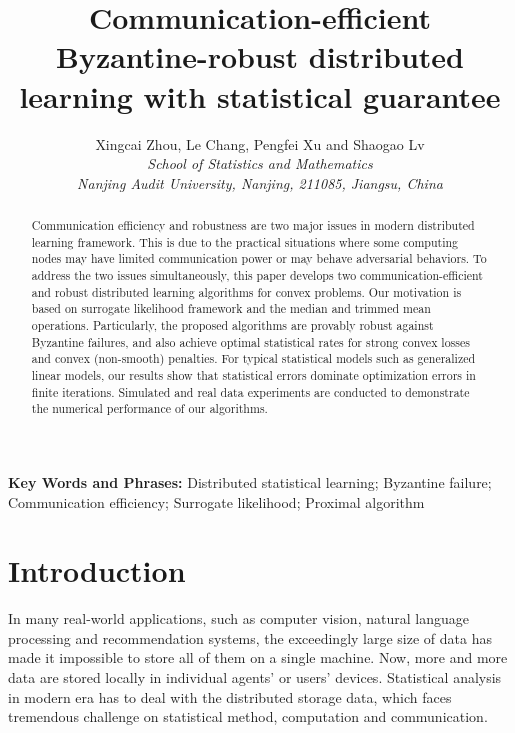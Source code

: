 \documentclass[12pt,a4paper]{article}%
\title{{Communication-efficient Byzantine-robust distributed learning with statistical guarantee}}
\author{Xingcai Zhou, Le Chang, Pengfei Xu and Shaogao Lv\\
{\sl School of Statistics and Mathematics}\\
{\sl Nanjing Audit University, Nanjing, 211085, Jiangsu, China}}
\date{}
\numberwithin{equation}{section}
\begin{document}
\maketitle
\setcounter{page}{1}

\begin{abstract}
Communication efficiency and robustness are two major issues in modern distributed learning framework. This is due to the practical situations where some computing nodes may have limited communication power or may behave adversarial behaviors. To address the two issues simultaneously,
this paper develops two communication-efficient and robust distributed learning algorithms for convex problems. Our motivation is based on surrogate likelihood framework and the median and trimmed mean operations. Particularly, the proposed algorithms are provably robust against Byzantine failures, and also achieve optimal statistical rates for strong convex losses and convex (non-smooth) penalties. For typical statistical models such as generalized linear models, our results show that statistical errors dominate optimization errors in finite iterations.
Simulated and real data experiments are conducted to demonstrate the numerical performance of our algorithms.
\end{abstract}

{\bf Key Words and Phrases:} Distributed statistical learning; Byzantine failure; Communication efficiency; Surrogate likelihood; Proximal algorithm\\


\section{Introduction}

In many real-world applications, such as computer vision, natural language processing and recommendation systems, the exceedingly large size of data has made it impossible to store all of them on a single machine. Now, more and more data are stored locally in  individual agents' or users' devices. Statistical analysis in modern era has to deal with the distributed storage data, which
faces tremendous challenge on statistical method, computation and communication.
\end{document}
